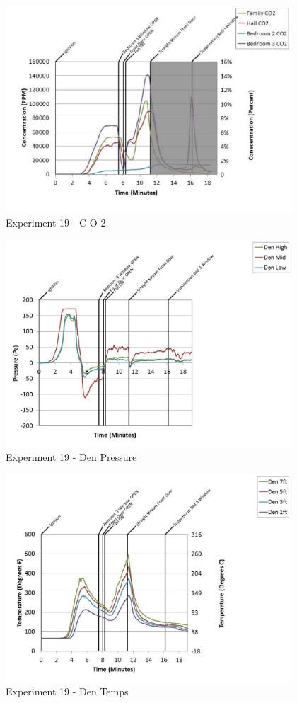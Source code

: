 \documentclass{article}
\begin{document}
\begin{appendices}
	\clearpage

	\begin{figure}[h!]
		\centering
		\includegraphics[height=3.05in]{0_Images/Results_Charts/Exp_19_Charts/CO2.pdf}
		\caption{Experiment 19 - C O 2}
	\end{figure}
 

	\begin{figure}[h!]
		\centering
		\includegraphics[height=3.05in]{0_Images/Results_Charts/Exp_19_Charts/DenPressure.pdf}
		\caption{Experiment 19 - Den Pressure}
	\end{figure}
 
	\clearpage

	\begin{figure}[h!]
		\centering
		\includegraphics[height=3.05in]{0_Images/Results_Charts/Exp_19_Charts/DenTemps.pdf}
		\caption{Experiment 19 - Den Temps}
	\end{figure}
 


\end{appendices}
\end{document}
